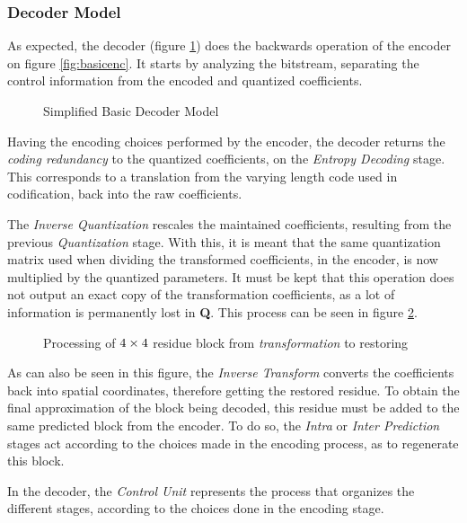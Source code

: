 \subsubsection{Decoder Model}

As expected, the decoder (figure \ref{fig:basicdec}) does the backwards operation of the encoder on figure \ref{fig:basicenc}. It starts by analyzing the bitstream, separating the control information from the encoded and quantized coefficients.

\begin{figure}[!htbp]
    \centering
    
    \caption{Simplified Basic Decoder Model}
    \label{fig:basicdec}
\end{figure}

Having the encoding choices performed by the encoder, the decoder returns the \emph{coding redundancy} to the quantized coefficients, on the \emph{Entropy Decoding} stage. This corresponds to a translation from the varying length code used in codification, back into the raw coefficients.

The \emph{Inverse Quantization} rescales the maintained coefficients, resulting from the previous \emph{Quantization} stage. With this, it is meant that the same quantization matrix used when dividing the transformed coefficients, in the encoder, is now multiplied by the quantized parameters. It must be kept that this operation does not output an exact copy of the transformation coefficients, as a lot of information is permanently lost in \textbf{Q}. This process can be seen in figure \ref{fig:quant}.

\begin{figure}[!htbp]
    \centering
    
    \caption{Processing of $\protect 4\times 4$ residue block from \emph{transformation} to restoring} 
    \label{fig:quant}
\end{figure}

As can also be seen in this figure, the \emph{Inverse Transform} converts the coefficients back into spatial coordinates, therefore getting the restored residue. To obtain the final approximation of the block being decoded, this residue must be added to the same predicted block from the encoder. To do so, the \emph{Intra} or \emph{Inter Prediction} stages act according to the choices made in the encoding process, as to regenerate this block.

In the decoder, the \emph{Control Unit} represents the process that organizes the different stages, according to the choices done in the encoding stage.

